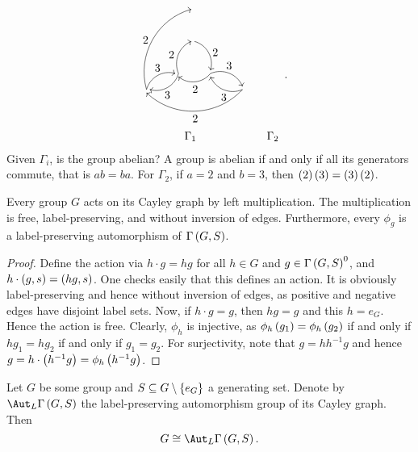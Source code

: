 \begin{example}
\begin{itemize}
$$\begin{array}{ccc}
\begin{tikzpicture}
\draw [->] (0, -1) to [bend left=45] node[right]{$ 2 $} (0.5, -1.9);
\draw [->] (-0.5, -2) to [bend left=45] node[left]{$ 2 $} (-0.1, -1);
\draw [->] (-0.5, -2) to [bend left=45] node[below]{$ 3 $} (-1.4, -2.5);
\draw [->] (0.5, -2) to [bend left=45] node[below]{$ 2 $} (-0.5, -2.1);
\draw [->] (0.5, -2) to [bend left=45] node[above]{$ 3 $} (1.5, -2.4);
\draw [->] (-1.5, -2.5) to [bend left=45] node[left]{$ 2 $} (-0.1, 0);
\draw [->] (-1.5, -2.5) to [bend left=45] node[above]{$ 3 $} (-0.6, -2);
\draw [->] (1.5, -2.5) to [bend left=45] node[below]{$ 3 $} (0.5, -2.1);
\draw [->] (1.5, -2.5) to [bend left=45] node[below]{$ 2 $} (-1.5, -2.6);
\end{tikzpicture}
\\
\Gamma_1 & & \Gamma_2
\end{array}.
$$
Given $ \Gamma_i $, is the group abelian? A group is abelian if and only if all its generators commute, that is $ ab = ba $. For $ \Gamma_2 $, if $ a = 2 $ and $ b = 3 $, then $ \br{2}\br{3} = \br{3}\br{2} $.
\end{itemize}
\end{example}

\pagebreak

\begin{lemma}
\label{lem:1.2.11}
Every group $ G $ acts on its Cayley graph by left multiplication. The multiplication is free, label-preserving, and without inversion of edges. Furthermore, every $ \phi_g $ is a label-preserving automorphism of $ \Gamma\br{G, S} $.
\end{lemma}

\begin{proof}
Define the action via $ h \cdot g = hg $ for all $ h \in G $ and $ g \in \Gamma\br{G, S}^0 $, and $ h \cdot \br{g, s} = \br{hg, s} $. One checks easily that this defines an action. It is obviously label-preserving and hence without inversion of edges, as positive and negative edges have disjoint label sets. Now, if $ h \cdot g = g $, then $ hg = g $ and this $ h = e_G $. Hence the action is free. Clearly, $ \phi_h $ is injective, as $ \phi_h\br{g_1} = \phi_h\br{g_2} $ if and only if $ hg_1 = hg_2 $ if and only if $ g_1 = g_2 $. For surjectivity, note that $ g = hh^{-1}g $ and hence $ g = h \cdot \br{h^{-1}g} = \phi_h\br{h^{-1}g} $.
\end{proof}


\begin{lemma}
Let $ G $ be some group and $ S \subseteq G \setminus \cbr{e_G} $ a generating set. Denote by $ \Aut_L \Gamma\br{G, S} $ the label-preserving automorphism group of its Cayley graph. Then
$$ G \cong \Aut_L \Gamma\br{G, S}. $$
\end{lemma}


